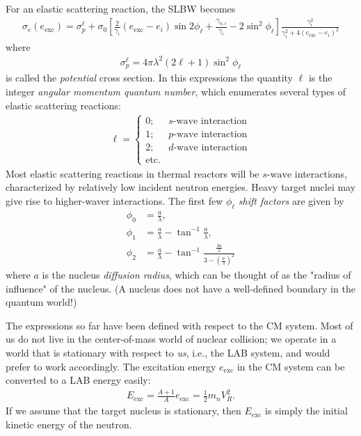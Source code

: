 \documentclass[11pt]{article}
\begin{document}
For an elastic scattering reaction, the SLBW becomes
\begin{align}
  \sigma_e(e_\text{exc}) = \sigma_p^\ell 
                         + \sigma_0 \left[ \frac{2}{\gamma_i}(e_\text{exc}-e_i) \sin 2\phi_\ell 
                                         + \frac{\gamma_{n,i}}{\gamma_i} -2 \sin^2 \phi_\ell \right] \frac{\gamma_i^2}{\gamma_i^2+4(e_\text{exc}-e_i)^2}
\end{align}
where
\begin{align}
  \sigma_p^\ell = 4\pi \lambda^2 \left( 2\ell + 1 \right) \sin^2 \phi_\ell
\end{align}
is called the \emph{potential} cross section.
In this expressions the quantity \(\ell\) is the integer \emph{angular momentum quantum number}, which enumerates several types of elastic scattering reactions:
\begin{align}
  \ell = 
  \begin{cases}
    0; & s\text{-wave interaction} \\
    1; & p\text{-wave interaction} \\
    2; & d\text{-wave interaction} \\
    \text{etc.} &
  \end{cases}
\end{align}
Most elastic scattering reactions in thermal reactors will be \(s\text{-wave}\) interactions, characterized by relatively low incident neutron energies.  Heavy target nuclei may give rise to higher-waver interactions.  The first few \(\phi_\ell\) \emph{shift factors} are given by
\begin{align}
  \phi_0 &= \frac{a}{\lambda}, \\
  \phi_1 &= \frac{a}{\lambda} - \tan^{-1} \frac{a}{\lambda}, \\
  \phi_2 &= \frac{a}{\lambda} - \tan^{-1} \frac{\frac{3a}{\lambda}}{3 - \left( \frac{a}{\lambda} \right)^2}
\end{align}
where \(a\) is the nucleus \emph{diffusion radius}, which can be thought of as the "radius of influence" of the nucleus.  (A nucleus does not have a well-defined boundary in the quantum world!)

The expressions so far have been defined with respect to the CM system.  Most of us do not live in the center-of-mass world of nuclear collision; we operate in a world that is stationary with respect to \emph{us}, i.e., the LAB system, and would prefer to work accordingly.  The excitation energy \(e_\text{exc}\) in the CM system can be converted to a LAB energy easily:
\begin{align}
  E_\text{exc} = \frac{A+1}{A}e_\text{exc} = \frac{1}{2} m_n V_R^2.
\end{align}
If we assume that the target nucleus is stationary, then \(E_\text{exc}\) is simply the initial kinetic energy of the neutron.
\end{document}
